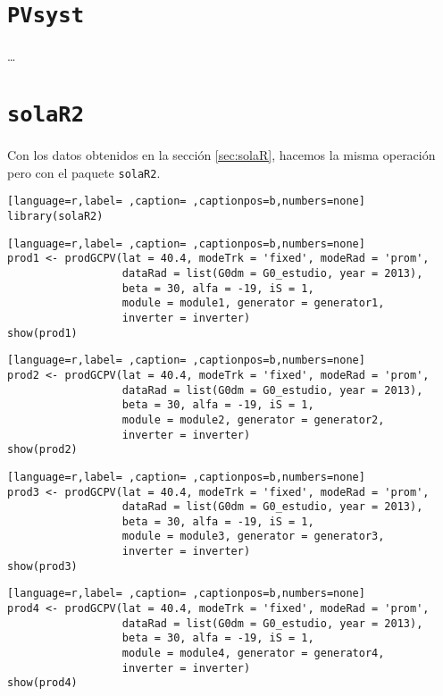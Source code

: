 \section{\texttt{PVsyst}}
\label{sec:orgdedd277}

\ldots{}


\section{\texttt{solaR2}}
\label{sec:org92d3b35}
\label{sec:solaR2}
Con los datos obtenidos en la sección \ref{sec:solaR}, hacemos la misma operación pero con el paquete \texttt{solaR2}.
\begin{lstlisting}[language=r,label= ,caption= ,captionpos=b,numbers=none]
library(solaR2)
\end{lstlisting}
\begin{lstlisting}[language=r,label= ,caption= ,captionpos=b,numbers=none]
prod1 <- prodGCPV(lat = 40.4, modeTrk = 'fixed', modeRad = 'prom',
                  dataRad = list(G0dm = G0_estudio, year = 2013),
                  beta = 30, alfa = -19, iS = 1,
                  module = module1, generator = generator1,
                  inverter = inverter)
show(prod1)
\end{lstlisting}
\begin{lstlisting}[language=r,label= ,caption= ,captionpos=b,numbers=none]
prod2 <- prodGCPV(lat = 40.4, modeTrk = 'fixed', modeRad = 'prom',
                  dataRad = list(G0dm = G0_estudio, year = 2013),
                  beta = 30, alfa = -19, iS = 1,
                  module = module2, generator = generator2,
                  inverter = inverter)
show(prod2)
\end{lstlisting}
\begin{lstlisting}[language=r,label= ,caption= ,captionpos=b,numbers=none]
prod3 <- prodGCPV(lat = 40.4, modeTrk = 'fixed', modeRad = 'prom',
                  dataRad = list(G0dm = G0_estudio, year = 2013),
                  beta = 30, alfa = -19, iS = 1,
                  module = module3, generator = generator3,
                  inverter = inverter)
show(prod3)
\end{lstlisting}
\begin{lstlisting}[language=r,label= ,caption= ,captionpos=b,numbers=none]
prod4 <- prodGCPV(lat = 40.4, modeTrk = 'fixed', modeRad = 'prom',
                  dataRad = list(G0dm = G0_estudio, year = 2013),
                  beta = 30, alfa = -19, iS = 1,
                  module = module4, generator = generator4,
                  inverter = inverter)
show(prod4)
\end{lstlisting}
